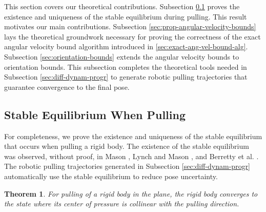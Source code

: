 \documentclass[conference]{IEEEtran}
\newtheorem{theorem}{Theorem}
\begin{document}
This section covers our theoretical contributions. Subsection
\ref{sec:stable-equil-when} proves the existence and uniqueness of the
stable equilibrium during pulling. This result motivates our main
contributions. Subsection \ref{sec:prop-angular-velocity-bounds} lays
the theoretical groundwork necessary for proving the correctness of
the exact angular velocity bound algorithm introduced in
\ref{sec:exact-ang-vel-bound-alg}. Subsection
\ref{sec:orientation-bounds} extends the angular velocity bounds to
orientation bounds. This subsection completes the theoretical tools
needed in Subsection \ref{sec:diff-dynam-progr} to generate robotic
pulling trajectories that guarantee convergence to the final pose.



\subsection{Stable Equilibrium When Pulling}\label{sec:stable-equil-when}

For completeness, we prove the existence and uniqueness of the stable
equilibrium that occurs when pulling a rigid body. The existence of
the stable equilibrium was observed, without proof, in Mason
\cite{mason1986}, Lynch and Mason \cite{lynch1995pulling}, and
Berretty et al. \cite{berretty2001orienting}. The robotic pulling
trajectories generated in Subsection \ref{sec:diff-dynam-progr}
automatically use the stable equilibrium to reduce pose uncertainty.

\begin{theorem} \label{thm:cop-lom-convergence} For pulling of a rigid
  body in the plane, the rigid body converges to the state where its
  center of pressure is collinear with the pulling direction.
\end{theorem}
\end{document}
